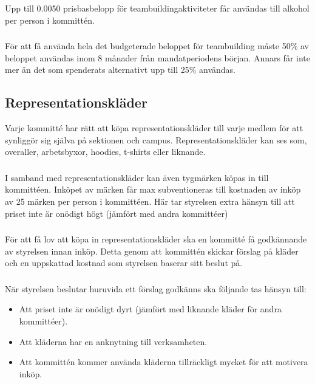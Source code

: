 \documentclass[a4paper, 10pt]{article}
\def\roundandprint #1{\xinttheiexpr #1\relax }
\newcommand{\prisbasbelopp}[1]{
    #1 prisbasbelopp 
    \ifdef{\nuvarandeprisbasbelopp}{
        \marginpar{
            \small{ \textbf{\roundandprint{\xintiexpr#1 * \nuvarandeprisbasbelopp\relax}kr}}
        }
    }{}
}
\begin{document}
\subsubsection{}
Upp till \prisbasbelopp{0.0050} för teambuildingaktiviteter får användas till alkohol per person i kommittén.

\subsubsection{}
För att få använda hela det budgeterade beloppet för teambuilding måste 50\% av beloppet användas inom 8 månader från mandatperiodens början. Annars får inte mer än det som spenderats alternativt upp till 25\% användas.


\subsection{Representationskläder}
Varje kommitté har rätt att köpa representationskläder till varje medlem för att synliggör sig själva på sektionen och campus. Representationskläder kan ses som, overaller, arbetsbyxor, hoodies, t-shirts eller liknande.

\subsubsection{}
I samband med representationskläder kan även tygmärken köpas in till kommittéen. Inköpet av märken får max subventioneras till kostnaden av inköp av 25 märken per person i kommittéen. Här tar styrelsen extra hänsyn till att priset inte är onödigt högt (jämfört med andra kommittéer)

\subsubsection{}
För att få lov att köpa in representationskläder ska en kommitté få godkännande av styrelsen innan inköp. Detta genom att kommittén skickar förslag på kläder och en uppskattad kostnad som styrelsen baserar sitt beslut på.

\subsubsection{}
När styrelsen beslutar huruvida ett förslag godkänns ska följande tas hänsyn till:
\begin{itemize}
    \item Att priset inte är onödigt dyrt (jämfört med liknande kläder för andra kommittéer).
    \item Att kläderna har en anknytning till verksamheten.
        \item Att kommittén kommer använda kläderna tillräckligt mycket för att motivera inköp.
\end{itemize}
\end{document}
